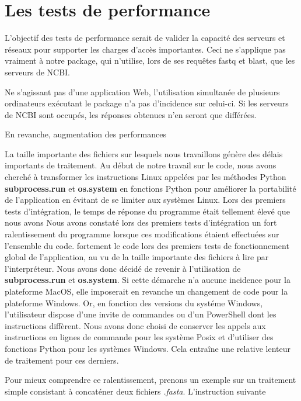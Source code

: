 \documentclass[twoside,a4paper,11pt,frenchb,openany]{report}
\begin{document}
\section{Les tests de performance}


L'objectif des tests de performance serait de valider la capacité des serveurs et réseaux pour supporter les charges d'accès importantes. Ceci ne s'applique pas vraiment à notre package, qui n'utilise, lors de ses requêtes fastq et blast, que les serveurs de NCBI.

Ne s'agissant pas d'une application Web, l'utilisation simultanée de plusieurs ordinateurs exécutant le package n'a pas d'incidence sur celui-ci. Si les serveurs de NCBI sont occupés, les réponses obtenues n'en seront que différées.

En revanche, augmentation des performances


La taille importante des fichiers sur lesquels nous travaillons génère des délais importants de traitement. Au début de notre travail sur le code, nous avons cherché à transformer les instructions Linux appelées par les méthodes Python \textbf{subprocess.run} et \textbf{os.system} en fonctions Python pour améliorer la portabilité de l'application en évitant de se limiter aux systèmes Linux. Lors des premiers tests d'intégration, le temps de réponse du programme était tellement élevé que nous avons Nous avons constaté lors des premiers tests d'intégration un fort ralentissement du programme lorsque ces modifications étaient effectuées sur l'ensemble du code. fortement le code lors des premiers tests de fonctionnement global de l'application, au vu de la taille importante des fichiers à lire par l'interpréteur. Nous avons donc décidé de revenir à l'utilisation de \textbf{subprocess.run} et \textbf{os.system}. Si cette démarche n'a aucune incidence pour la plateforme MacOS, elle imposerait en revanche un changement de code pour la plateforme Windows. Or, en fonction des versions du systéme Windows, l'utilisateur dispose d'une invite de commandes ou d'un PowerShell dont les instructions diffèrent. Nous avons donc choisi de conserver les appels aux instructions en lignes de commande pour les système Posix et d'utiliser des fonctions Python pour les systèmes Windows. Cela entraîne une relative lenteur de traitement pour ces derniers. 

Pour mieux comprendre ce ralentissement, prenons un exemple sur un traitement simple consistant à concaténer deux fichiers \textit{.fasta}. L'instruction suivante
\end{document}
